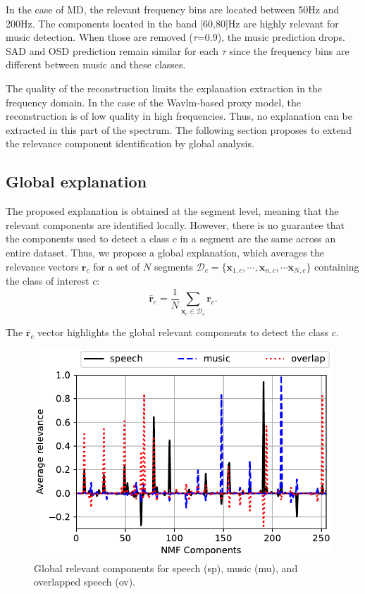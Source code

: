 In the case of MD, the relevant frequency bins are located between 50Hz and 200Hz.
The components located in the band [60,80]Hz are highly relevant for music detection.
When those are removed ($\tau$=0.9), the music prediction drops.
SAD and OSD prediction remain similar for each $\tau$ since the frequency bins are different between music and these classes.

The quality of the reconstruction limits the explanation extraction in the frequency domain.
In the case of the Wavlm-based proxy model, the reconstruction is of low quality in high frequencies. 
Thus, no explanation can be extracted in this part of the spectrum.
The following section proposes to extend the relevance component identification by global analysis.

\subsection{Global explanation}

The proposed explanation is obtained at the segment level, meaning that the relevant components are identified locally.
However, there is no guarantee that the components used to detect a class $c$ in a segment are the same across an entire dataset.
Thus, we propose a global explanation, which averages the relevance vectors $\mathbf{r}_{c}$ for a set of $N$ segments $\mathcal{D}_c=\{\mathbf{x}_{1,c}, \cdots, \mathbf{x}_{n,c}, \cdots \mathbf{x}_{N,c}\}$ containing the class of interest $c$:
\begin{equation}
    \bar{\mathbf{r}}_{c} = \frac{1}{N}\sum_{\mathbf{x}_{c}\in\mathcal{D}_c} \mathbf{r}_c.
    \label{eq:avg_rel}
\end{equation}

The $\bar{\mathbf{r}}_{c}$ vector highlights the global relevant components to detect the class $c$.

\begin{figure}[htb]
    \centering
    \includegraphics[width=0.8\linewidth]{figs/r_kc_acc.pdf}
    \caption{Global relevant components for speech (sp), music (mu), and overlapped speech (ov).}
    \label{fig:global_exp}
\end{figure}


